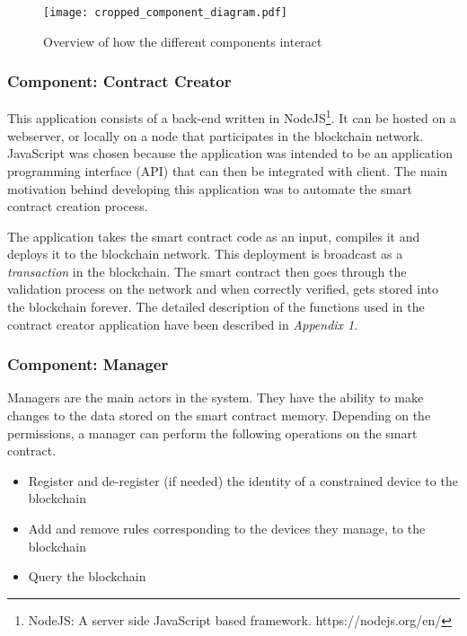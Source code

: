 \documentclass[english]{tktltiki}
\begin{document}
\begin{figure}[H]
\begin{center}
\texttt{[image: cropped\_component\_diagram.pdf]}
\caption{Overview of how the different components interact}
\label{proof-of-concept}
\end{center}
\end{figure}


\subsubsection{Component: Contract Creator} \label{component:contract_creator}
This application consists of a back-end written in NodeJS\footnote{NodeJS: A server side JavaScript based framework. https://nodejs.org/en/}. It can be hosted on a webserver, or locally on a node that participates in the blockchain network. JavaScript was chosen because the application was intended to be an application programming interface (API) that can then be integrated with client. The main motivation behind developing this application was to automate the smart contract creation process. 

The application takes the smart contract code as an input, compiles it and deploys it to the blockchain network. This deployment is broadcast as a \textit{transaction} in the blockchain. The smart contract then goes through the validation process on the network and when correctly verified, gets stored into the blockchain forever. The detailed description of the functions used in the contract creator application have been described in \textit{Appendix 1}.

\subsubsection{Component: Manager}
Managers are the main actors in the system. They have the ability to make changes to the data stored on the smart contract memory. Depending on the permissions, a manager can perform the following operations on the smart contract.
\begin{itemize}
\item Register and de-register (if needed) the identity of a constrained device to the blockchain
\item Add and remove rules corresponding to the devices they manage, to the blockchain
\item Query the blockchain
\end{itemize}
\end{document}
